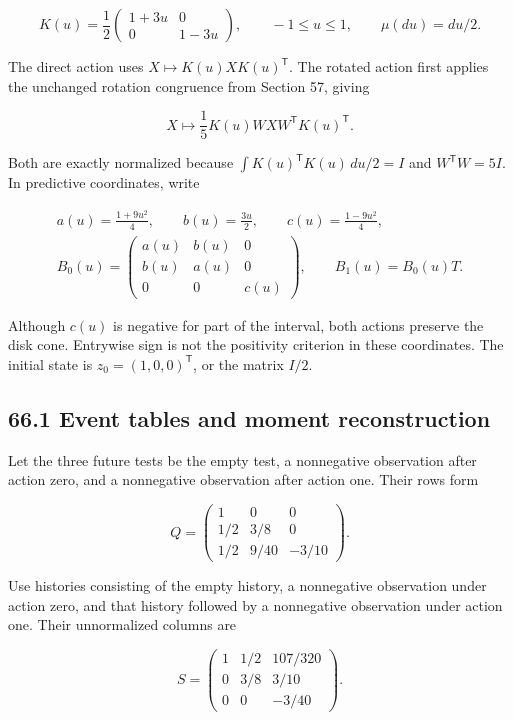 \[
K(u)=\frac12\begin{pmatrix}1+3u&0\\0&1-3u\end{pmatrix},
\qquad -1\leq u\leq1,
\qquad \mu(du)=du/2.
\]

The direct action uses \(X\mapsto K(u)XK(u)^{\mathsf T}\). The rotated
action first applies the unchanged rotation congruence from Section 57,
giving

\[
X\longmapsto\frac15 K(u)WXW^{\mathsf T}K(u)^{\mathsf T}.
\]

Both are exactly normalized because
\(\int K(u)^{\mathsf T}K(u)\,du/2=I\) and \(W^{\mathsf T}W=5I\). In
predictive coordinates, write

\[
\begin{gathered}
a(u)=\frac{1+9u^2}{4},\qquad
b(u)=\frac{3u}{2},\qquad
c(u)=\frac{1-9u^2}{4},\\[3pt]
B_0(u)=\begin{pmatrix}a(u)&b(u)&0\\b(u)&a(u)&0\\0&0&c(u)\end{pmatrix},
\qquad B_1(u)=B_0(u)T.
\end{gathered}
\]

Although \(c(u)\) is negative for part of the interval, both actions
preserve the disk cone. Entrywise sign is not the positivity criterion
in these coordinates. The initial state is \(z_0=(1,0,0)^{\mathsf T}\),
or the matrix \(I/2\).

\subsection{66.1 Event tables and moment
reconstruction}\label{LSM:event-tables-and-moment-reconstruction}

Let the three future tests be the empty test, a nonnegative observation
after action zero, and a nonnegative observation after action one. Their
rows form

\[
Q=\begin{pmatrix}
1&0&0\\
1/2&3/8&0\\
1/2&9/40&-3/10
\end{pmatrix}.
\]

Use histories consisting of the empty history, a nonnegative observation
under action zero, and that history followed by a nonnegative
observation under action one. Their unnormalized columns are

\[
S=\begin{pmatrix}
1&1/2&107/320\\
0&3/8&3/10\\
0&0&-3/40
\end{pmatrix}.
\]


